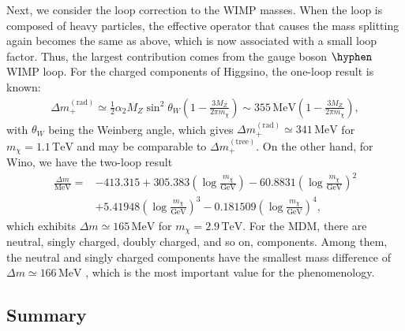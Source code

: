 \documentclass[12pt,twoside,book]{article}
\begin{document}
Next, we consider the loop correction to the WIMP masses.
When the loop is composed of heavy particles, the effective operator that causes the mass splitting again becomes the same as above, which is now associated with a small loop factor.
Thus, the largest contribution comes from the gauge boson $\hyphen$ WIMP loop.
For the charged components of Higgsino, the one-loop result is known: \cite{Fukuda:2017jmk}
\begin{align}
  \Delta m_{+}^{\mathrm{(rad)}} \simeq \frac{1}{2} \alpha_2 M_Z \sin^2 \theta_W
  \left( 1 - \frac{3 M_Z}{2\pi m_\chi} \right)
  \sim 355\,\mathrm{MeV} \left( 1 - \frac{3 M_Z}{2\pi m_\chi} \right),
  \label{eq:Higgsino_delm_rad}
\end{align}
with $\theta_W$ being the Weinberg angle, which gives $\Delta m_{+}^{\mathrm{(rad)}} \simeq 341\,\mathrm{MeV}$ for $m_\chi = 1.1\,\mathrm{TeV}$ and may be comparable to $\Delta m_{+}^{\mathrm{(tree)}}$.
On the other hand, for Wino, we have the two-loop result \cite{Ibe:2012sx}
\newcommand{\logmchi}{\left( \log \frac{m_\chi}{\mathrm{GeV}} \right)}
\begin{align}
  \frac{\Delta m}{\mathrm{MeV}} =
  &-413.315 + 305.383 \logmchi - 60.8831 \logmchi^2\\
  &+ 5.41948 \logmchi^3 - 0.181509 \logmchi^4,
\end{align}
which exhibits $\Delta m \simeq 165\,\mathrm{MeV}$ for $m_\chi = 2.9\,\mathrm{TeV}$.
For the MDM, there are neutral, singly charged, doubly charged, and so on, components.
Among them, the neutral and singly charged components have the smallest mass difference of $\Delta m \simeq 166\, \mathrm{MeV}$ \cite{Cirelli:2005uq}, which is the most important value for the phenomenology.


\subsection{Summary}
\label{sec:model_summary}
\end{document}
